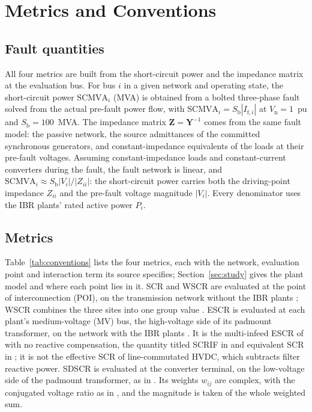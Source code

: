 \section{Metrics and Conventions}
\label{sec:metrics}

\subsection{Fault quantities}

All four metrics are built from the short-circuit power and the impedance matrix at the evaluation
bus. For bus $i$ in a given network and operating state, the short-circuit power $\mathrm{SCMVA}_i$ (MVA) is
obtained from a bolted three-phase fault solved from the actual pre-fault power flow, with
$\mathrm{SCMVA}_i = S_\mathrm{b}|I_{\mathrm{f},i}|$ at $V_\mathrm{n} = 1$~pu and $S_\mathrm{b} = 100$~MVA. The
impedance matrix $\mathbf{Z} = \mathbf{Y}^{-1}$ comes from the same fault model: the passive
network, the source admittances of the committed synchronous generators, and constant-impedance
equivalents of the loads at their pre-fault voltages. Assuming constant-impedance loads and constant-current
converters during the fault, the fault network is linear, and
$\mathrm{SCMVA}_i \approx S_\mathrm{b}|V_i|/|Z_{ii}|$: the short-circuit power carries both the driving-point
impedance $Z_{ii}$ and the pre-fault voltage magnitude $|V_i|$. Every denominator uses the IBR plants' rated active
power $P_i$.

\subsection{Metrics}

Table~\ref{tab:conventions} lists the four metrics, each with the network, evaluation point and
interaction term its source specifies; Section~\ref{sec:study} gives the plant model and where each
point lies in it. SCR and WSCR are evaluated at the point of interconnection (POI), on the
transmission network without the IBR plants \cite{ieee2800}; WSCR combines the three sites into one
group value \cite{ieee2800,zhang2014}. ESCR is evaluated at each plant's medium-voltage (MV) bus,
the high-voltage side of its padmount transformer, on the network with the IBR plants
\cite{fingrid2023}. It is the multi-infeed ESCR of
\cite{cigre364} with no reactive compensation, the quantity titled SCRIF in \cite{ieee2800} and
equivalent SCR in \cite{cigre671,fingrid2023}; it is not the effective SCR of line-commutated HVDC,
which subtracts filter reactive power. SDSCR is evaluated at the converter terminal, on the low-voltage
side of the padmount transformer, as in \cite{wu2018}. Its weights $w_{ij}$ are complex, with the conjugated
voltage ratio as in \cite{wu2018,maharjan2023}, and
the magnitude is taken of the whole weighted sum.

